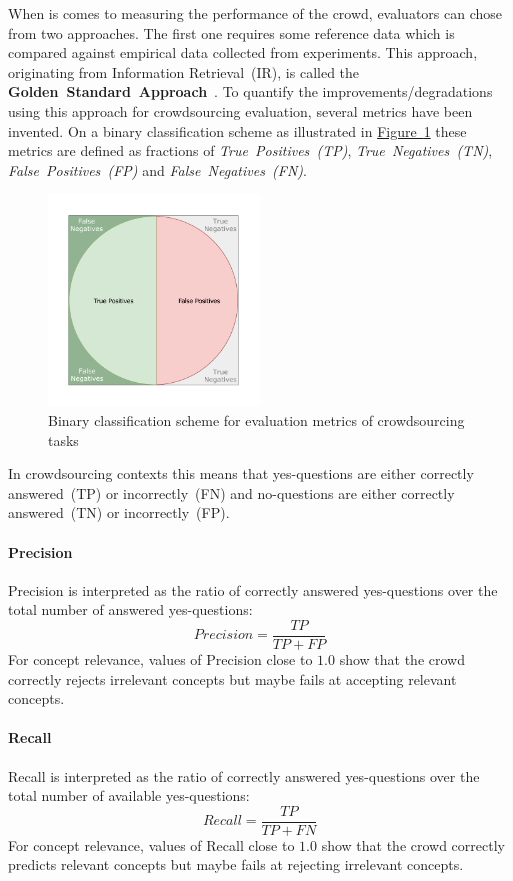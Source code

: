 \documentclass[draft,final]{vutinfth} %
\begin{document}
When is comes to measuring the performance of the crowd, evaluators can chose from two approaches. The first one requires some reference data which is compared against empirical data collected from experiments. This approach, originating from Information Retrieval~(IR), is called the \textbf{Golden~Standard~Approach}~\cite{brank2005}. To quantify the improvements/degradations using this approach for crowdsourcing evaluation, several metrics have been invented. On a binary classification scheme as illustrated in \hyperref[fig:binary_classification_metrics]{Figure~\ref*{fig:binary_classification_metrics}} these metrics are defined as fractions of \emph{True~Positives~(TP)}, \emph{True~Negatives~(TN)}, \emph{False~Positives~(FP)} and \emph{False~Negatives~(FN)}.
\begin{figure}
	 \centering
	 \includegraphics[width=0.5\textwidth]{drawio/Binary_Classification_Scheme}
	 \caption{Binary classification scheme for evaluation metrics of crowdsourcing tasks}\label{fig:binary_classification_metrics}
\end{figure}
In crowdsourcing contexts this means that yes-questions are either correctly answered~(TP) or incorrectly~(FN) and no-questions are either correctly answered~(TN) or incorrectly~(FP).

\paragraph{Precision} Precision is interpreted as the ratio of correctly answered yes-questions over the total number of answered yes-questions:
\[ Precision = \frac{TP}{TP + FP} \]
For concept relevance, values of Precision close to $1.0$ show that the crowd correctly rejects irrelevant concepts but maybe fails at accepting relevant concepts. 
\paragraph{Recall} Recall is interpreted as the ratio of correctly answered yes-questions over the total number of available yes-questions:
\[ Recall = \frac{TP}{TP + FN} \]
For concept relevance, values of Recall close to $1.0$ show that the crowd correctly predicts relevant concepts but maybe fails at rejecting irrelevant concepts. 
\end{document}
